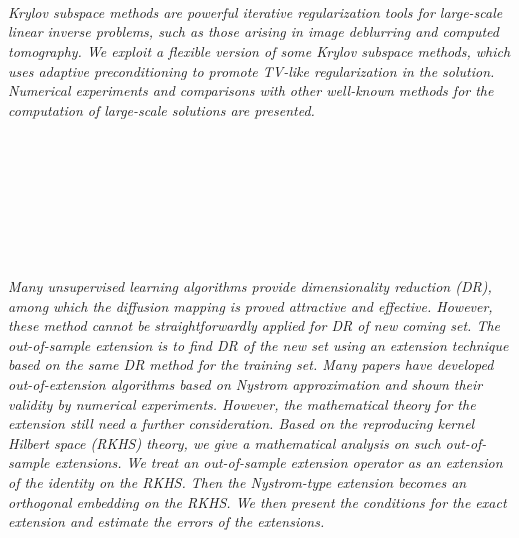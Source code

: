 \begin{multicols}{2}
\\ 
        \\
        \\\\
        \\
        \\\\
\\
      \textit{Krylov subspace methods are powerful iterative regularization tools for large-scale linear inverse problems, such as those arising in image deblurring and computed tomography. We exploit a flexible version of some Krylov subspace methods, which uses adaptive preconditioning to promote TV-like regularization in the solution. Numerical experiments and comparisons with other well-known methods for the computation of large-scale solutions are presented. }\\
\\ 
        \\
        \\\\
        \\
        \\\\
\\
      \textit{ Many unsupervised learning algorithms provide dimensionality reduction (DR), among which the diffusion mapping is proved attractive and effective. However, these method cannot be straightforwardly applied for DR of new coming set. The out-of-sample extension is to find DR of the new set using an extension technique based on the same DR method for the training set. Many papers have developed out-of-extension algorithms based on Nystrom approximation and shown their validity by numerical experiments. However, the mathematical theory for the extension still need a further consideration.  Based on the reproducing kernel Hilbert space (RKHS) theory, we give a mathematical analysis on such out-of-sample extensions. We treat an out-of-sample extension operator as an extension of the identity on the RKHS. Then the Nystrom-type extension becomes an orthogonal embedding on the RKHS. We then present the conditions for the exact extension and estimate the errors of the extensions.}\\
\\ 
        \\

\end{multicols}
